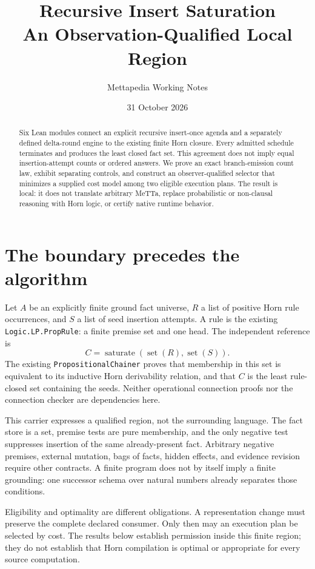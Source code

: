 \documentclass[11pt,a4paper]{article}
\title{Recursive Insert Saturation\\
  \large An Observation-Qualified Local Region}
\author{Mettapedia Working Notes}
\date{31 October 2026}
\newcommand{\code}[1]{\nolinkurl{#1}}
\begin{document}
\maketitle

\begin{abstract}
Six Lean modules connect an explicit recursive insert-once agenda and a
separately defined delta-round engine to the existing finite Horn closure.
Every admitted schedule terminates and produces the least closed fact set.
This agreement does not imply equal insertion-attempt counts or ordered
answers. We prove an exact branch-emission count law, exhibit separating
controls, and construct an observer-qualified selector that minimizes a
supplied cost model among two eligible execution plans. The result is local:
it does not translate arbitrary MeTTa, replace probabilistic or non-clausal
reasoning with Horn logic, or certify native runtime behavior.
\end{abstract}

\section{The boundary precedes the algorithm}

Let $A$ be an explicitly finite ground fact universe, $R$ a list of positive
Horn rule occurrences, and $S$ a list of seed insertion attempts. A rule is
the existing \code{Logic.LP.PropRule}: a finite premise set and one head.
The independent reference is
\[
  C=\operatorname{saturate}(\operatorname{set}(R),\operatorname{set}(S)).
\]
The existing \code{PropositionalChainer} proves that membership in this set
is equivalent to its inductive Horn derivability relation, and that $C$ is
the least rule-closed set containing the seeds. Neither operational
connection proofs nor the connection checker are dependencies here.

This carrier expresses a qualified region, not the surrounding language.
The fact store is a set, premise tests are pure membership, and the only
negative test suppresses insertion of the same already-present fact.
Arbitrary negative premises, external mutation, bags of facts, hidden effects,
and evidence revision require other contracts. A finite program does not by
itself imply a finite grounding: one successor schema over natural numbers
already separates those conditions.

Eligibility and optimality are different obligations. A representation
change must preserve the complete declared consumer. Only then may an
execution plan be selected by cost. The results below establish permission
inside this finite region; they do not establish that Horn compilation is
optimal or appropriate for every source computation.
\end{document}
